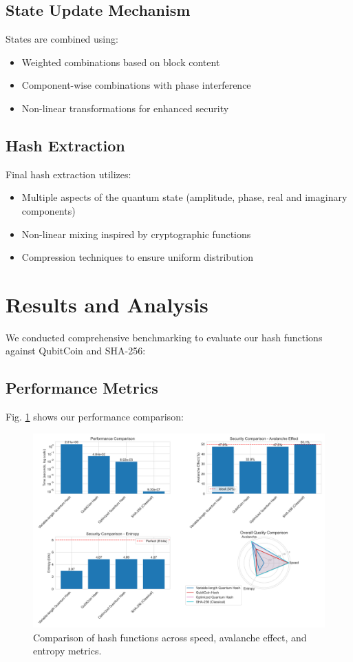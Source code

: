 \documentclass[conference]{IEEEtran}
\begin{document}
\subsection{State Update Mechanism}
States are combined using:
\begin{itemize}
    \item Weighted combinations based on block content
    \item Component-wise combinations with phase interference
    \item Non-linear transformations for enhanced security
\end{itemize}

\subsection{Hash Extraction}
Final hash extraction utilizes:
\begin{itemize}
    \item Multiple aspects of the quantum state (amplitude, phase, real and imaginary components)
    \item Non-linear mixing inspired by cryptographic functions
    \item Compression techniques to ensure uniform distribution
\end{itemize}

\section{Results and Analysis}
We conducted comprehensive benchmarking to evaluate our hash functions against QubitCoin and SHA-256:

\subsection{Performance Metrics}
Fig. \ref{fig:hash_comparison} shows our performance comparison:

\begin{figure}[!ht]
\centering
\includegraphics[width=\columnwidth]{visualizations/hash_comparison.png}
\caption{Comparison of hash functions across speed, avalanche effect, and entropy metrics.}
\label{fig:hash_comparison}
\end{figure}
\end{document}
